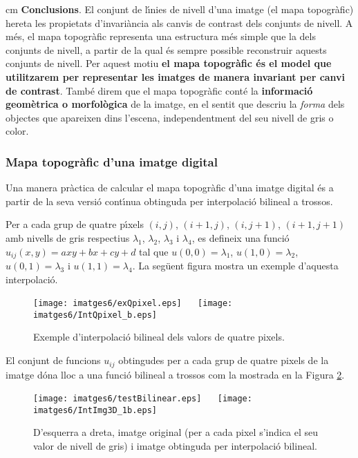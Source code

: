 \documentclass{article}
\begin{document}
 cm
\noindent
{\bf Conclusions}. El conjunt de l\'\i nies de nivell d'una imatge (el mapa topogr\`afic) hereta les propietats
d'invari\`ancia als canvis de contrast dels conjunts de nivell. 
A m\'es, el mapa topogr\`afic representa una estructura m\'es simple que la dels conjunts de nivell, a partir de la 
qual \'es sempre possible reconstruir aquests conjunts de nivell. Per aquest motiu 
{\bf el mapa topogr\`afic \'es el model que utilitzarem per representar les imatges de manera invariant per canvi de contrast}. Tamb\'e direm que el mapa topogr\`afic cont\'e la {\bf informaci\'o geom\`etrica o morfol\`ogica} 
de la imatge, en el sentit que descriu la {\it forma} dels objectes que apareixen dins l'escena,
independentment del seu nivell de gris o color.


\subsubsection{Mapa topogr\`afic d'una imatge digital}

Una manera pr\`actica de calcular el mapa topogr\`afic d'una imatge digital \'es a partir de la 
seva versi\'o cont\'\i nua obtinguda per interpolaci\'o bilineal a trossos. 

Per a cada grup de quatre 
p\'\i xels $(i, j)$, $(i+1, j)$, $(i, j+1)$, $(i+1, j+1)$ amb nivells de gris respectius $\lambda_1$,
$\lambda_2$, $\lambda_3$ i $\lambda_4$, es defineix una funci\'o $u_{ij}(x, y)=axy+bx+cy+d$ tal que
$u(0, 0)=\lambda_1$, $u(1, 0)=\lambda_2$, $u(0, 1)=\lambda_3$ i $u(1, 1)=\lambda_4$. La seg\"uent 
figura mostra un exemple d'aquesta interpolaci\'o.

\begin{figure}[htbp]
\begin{center}
\texttt{[image: imatges6/exQpixel.eps]} $\quad$
\texttt{[image: imatges6/IntQpixel\_b.eps]}
\end{center}
\caption{Exemple d'interpolaci\'o bilineal dels valors de quatre pixels.}
\label{ex_bilinear4}
\end{figure}

El conjunt de funcions $u_{ij}$ obtingudes per a cada grup de quatre pixels de la imatge d\'ona lloc a una 
funci\'o bilineal a trossos com la mostrada en la Figura \ref{ex_bilinear}.

\begin{figure}[htbp]
\begin{center}
\texttt{[image: imatges6/testBilinear.eps]} $\quad$
\texttt{[image: imatges6/IntImg3D\_1b.eps]}
\end{center}
\caption{D'esquerra a dreta, imatge original (per a cada pixel s'indica el seu valor de nivell de gris) 
i imatge obtinguda per interpolaci\'o bilineal.}
\label{ex_bilinear}
\end{figure}
\end{document}
